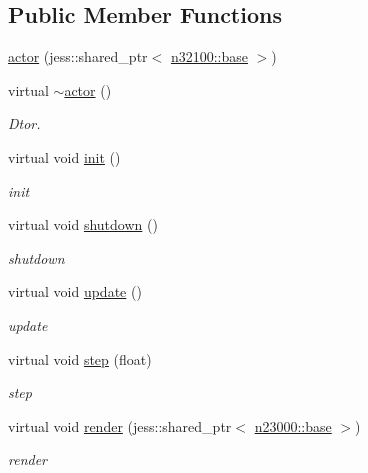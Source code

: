 \subsection*{Public Member Functions}
\begin{DoxyCompactItemize}
\item 
\hyperlink{classnebula_1_1content_1_1actor_1_1admin_1_1actor_a17df7b068ec0a1ea2fd32a0ffd163ceb}{actor} (jess::shared\_\-ptr$<$ \hyperlink{classnebula_1_1content_1_1scene_1_1admin_1_1base}{n32100::base} $>$)
\item 
virtual \hyperlink{classnebula_1_1content_1_1actor_1_1admin_1_1actor_ab744500c0b6b457652b61534426be637}{$\sim$actor} ()
\begin{DoxyCompactList}\small\item\em Dtor. \item\end{DoxyCompactList}\item 
virtual void \hyperlink{classnebula_1_1content_1_1actor_1_1admin_1_1actor_a36b8f2c3d8b0bab0a2a3540ec1bf693d}{init} ()
\begin{DoxyCompactList}\small\item\em init \item\end{DoxyCompactList}\item 
virtual void \hyperlink{classnebula_1_1content_1_1actor_1_1admin_1_1actor_a99f23953573c4f96672d9fb7b3cfe4fb}{shutdown} ()
\begin{DoxyCompactList}\small\item\em shutdown \item\end{DoxyCompactList}\item 
virtual void \hyperlink{classnebula_1_1content_1_1actor_1_1admin_1_1actor_a9290e8e1981731fe362d3995cf010514}{update} ()
\begin{DoxyCompactList}\small\item\em update \item\end{DoxyCompactList}\item 
virtual void \hyperlink{classnebula_1_1content_1_1actor_1_1admin_1_1actor_af4b68cdf9481cd0ad5f56a78bb691997}{step} (float)
\begin{DoxyCompactList}\small\item\em step \item\end{DoxyCompactList}\item 
virtual void \hyperlink{classnebula_1_1content_1_1actor_1_1admin_1_1actor_a1f4c2d9c8967293cad22dd8986e4886c}{render} (jess::shared\_\-ptr$<$ \hyperlink{classnebula_1_1platform_1_1renderer_1_1base}{n23000::base} $>$)
\begin{DoxyCompactList}\small\item\em render \item\end{DoxyCompactList}\end{DoxyCompactItemize}
